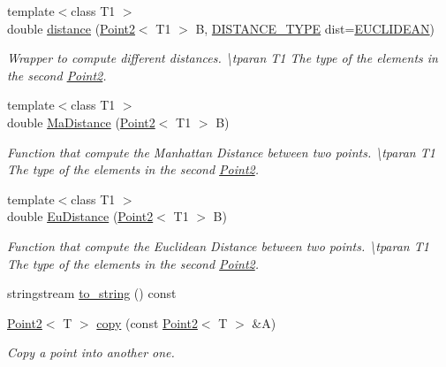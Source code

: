 \begin{DoxyCompactItemize}
{\footnotesize template$<$class T1 $>$ }\\double \mbox{\hyperlink{class_point2_a5f50f8f110af78415a56b0c32c2c8b8f}{distance}} (\mbox{\hyperlink{class_point2}{Point2}}$<$ T1 $>$ B, \mbox{\hyperlink{maths_8hh_ac50d7263b1cae8691420b86282b27f90}{D\+I\+S\+T\+A\+N\+C\+E\+\_\+\+T\+Y\+PE}} dist=\mbox{\hyperlink{maths_8hh_ac50d7263b1cae8691420b86282b27f90a81bbbc4428c3ff3f1327e94957e2b5f1}{E\+U\+C\+L\+I\+D\+E\+AN}})
\begin{DoxyCompactList}\small\item\em Wrapper to compute different distances. \textbackslash{}tparan T1 The type of the elements in the second {\ttfamily \mbox{\hyperlink{class_point2}{Point2}}}. \end{DoxyCompactList}\item 
{\footnotesize template$<$class T1 $>$ }\\double \mbox{\hyperlink{class_point2_a10a4aa3d7939b1675f4bd18b8f9f0ead}{Ma\+Distance}} (\mbox{\hyperlink{class_point2}{Point2}}$<$ T1 $>$ B)
\begin{DoxyCompactList}\small\item\em Function that compute the Manhattan Distance between two points. \textbackslash{}tparan T1 The type of the elements in the second {\ttfamily \mbox{\hyperlink{class_point2}{Point2}}}. \end{DoxyCompactList}\item 
{\footnotesize template$<$class T1 $>$ }\\double \mbox{\hyperlink{class_point2_aa930b619ed2efeda96b4210ee3b8cb9c}{Eu\+Distance}} (\mbox{\hyperlink{class_point2}{Point2}}$<$ T1 $>$ B)
\begin{DoxyCompactList}\small\item\em Function that compute the Euclidean Distance between two points. \textbackslash{}tparan T1 The type of the elements in the second {\ttfamily \mbox{\hyperlink{class_point2}{Point2}}}. \end{DoxyCompactList}\item 
stringstream \mbox{\hyperlink{class_point2_aa04082290a2f554060081beafd7d7e0d}{to\+\_\+string}} () const
\item 
\mbox{\hyperlink{class_point2}{Point2}}$<$ T $>$ \mbox{\hyperlink{class_point2_abf5cfefe8e75dda02f681fc8d74c2c39}{copy}} (const \mbox{\hyperlink{class_point2}{Point2}}$<$ T $>$ \&A)
\begin{DoxyCompactList}\small\item\em Copy a point into another one. \end{DoxyCompactList}\item 

\end{DoxyCompactItemize}
